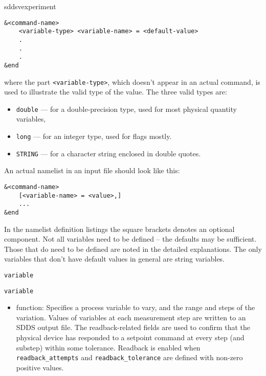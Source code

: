 \begin{sddsprog}{sddsvexperiment}
\begin{itemize}
\begin{verbatim}
&<command-name>
    <variable-type> <variable-name> = <default-value>
    .
    .
    .
&end
\end{verbatim}

where the part \verb+<variable-type>+, which doesn't appear in an
actual command, is used to illustrate the valid type of the value. The
three valid types are:
\begin{itemize}
   \item \verb+double+ --- for a double-precision type, used for most
   physical quantity variables,
   \item \verb+long+ ---   for an integer type, used for flags mostly.
   \item \verb+STRING+ --- for a character string enclosed in double quotes.
\end{itemize}
An actual namelist in an input file should look like this:
\begin{verbatim}
&<command-name>
    [<variable-name> = <value>,]
    ...
&end
\end{verbatim}

In the namelist definition listings the square brackets denotes an
optional component.  Not all variables need to be defined -- the
defaults may be sufficient.  Those that do need to be defined are
noted in the detailed explanations.  The only variables that don't
have default values in general are string variables.


\begin{latexonly}
\newpage\begin{center}{\Large \verb+variable+}\end{center}
\end{latexonly}
\begin{htmlonly}
\item {\Large \verb+variable+}
\end{htmlonly}

\begin{itemize}
   \item function: Specifies a process variable to vary, and the range
      and steps of the variation.  Values of variables at each
      measurement step are written to an SDDS output file.  The
      readback-related fields are used to confirm that the physical
      device has responded to a setpoint command at every step (and
      substep) within some tolerance. Readback is enabled when
      {\verb+readback_attempts+} and {\verb+readback_tolerance+} are
      defined with non-zero positive values.


\end{itemize}
\end{itemize}
\end{sddsprog}

